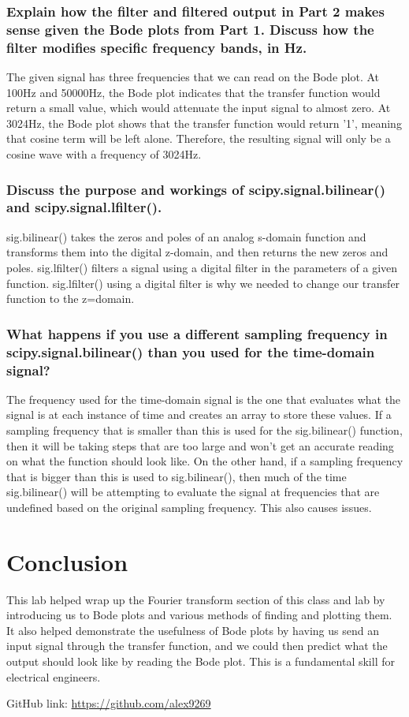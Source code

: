 \documentclass[12pt]{report}
\begin{document}
 \subsubsection{Explain how the filter and filtered output in Part 2 makes sense given the Bode plots from Part 1. Discuss how the filter modifies specific frequency bands, in Hz.}
 
The given signal has three frequencies that we can read on the Bode plot. At 100Hz and 50000Hz, the Bode plot indicates that the transfer function would return a small value, which would attenuate the input signal to almost zero. At 3024Hz, the Bode plot shows that the transfer function would return '1', meaning that cosine term will be left alone. Therefore, the resulting signal will only be a cosine wave with a frequency of 3024Hz. 
 
 \subsubsection{Discuss the purpose and workings of scipy.signal.bilinear() and scipy.signal.lfilter().}
 
sig.bilinear() takes the zeros and poles of an analog s-domain function and transforms them into the digital z-domain, and then returns the new zeros and poles. sig.lfilter() filters a signal using a digital filter in the parameters of a given function. sig.lfilter() using a digital filter is why we needed to change our transfer function to the z=domain.
 
 \subsubsection{What happens if you use a different sampling frequency in scipy.signal.bilinear() than you used for the time-domain signal?}
 
The frequency used for the time-domain signal is the one that evaluates what the signal is at each instance of time and creates an array to store these values. If a sampling frequency that is smaller than this is used for the sig.bilinear() function, then it will be taking steps that are too large and won't get an accurate reading on what the function should look like. On the other hand, if a sampling frequency that is bigger than this is used to sig.bilinear(), then much of the time sig.bilinear() will be attempting to evaluate the signal at frequencies that are undefined based on the original sampling frequency. This also causes issues.

 \section{Conclusion}
 
This lab helped wrap up the Fourier transform section of this class and lab by introducing us to Bode plots and various methods of finding and plotting them. It also helped demonstrate the usefulness of Bode plots by having us send an input signal through the transfer function, and we could then predict what the output should look like by reading the Bode plot. This is a fundamental skill for electrical engineers. 
 
 GitHub link: \url{https://github.com/alex9269}
 
\end{document}
